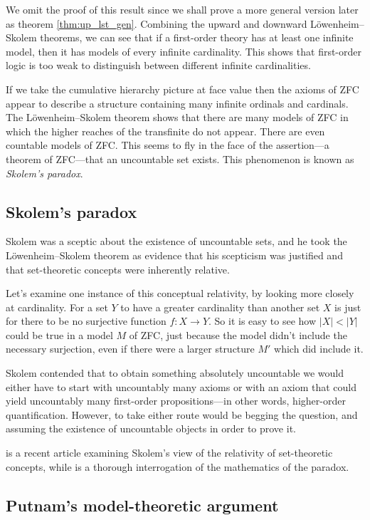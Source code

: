 \documentclass[10pt, a4paper, oneside]{article}
\theoremstyle{definition}
\theoremstyle{remark}
\theoremstyle{plain}
\theoremstyle{plain}
\begin{document}
We omit the proof of this result since we shall prove a more general version
later as theorem \ref{thm:up_lst_gen}. Combining the upward and downward
Löwenheim--Skolem theorems, we can see that if a first-order theory has at
least one infinite model, then it has models of every infinite cardinality. This
shows that first-order logic is too weak to distinguish between different
infinite cardinalities.

If we take the cumulative hierarchy picture at face value then the axioms of ZFC
appear to describe a structure containing many infinite ordinals and cardinals.
The Löwenheim--Skolem theorem shows that there are many models of ZFC in which
the higher reaches of the transfinite do not appear. There are even countable
models of ZFC. This seems to fly in the face of the assertion---a theorem of
ZFC---that an uncountable set exists. This phenomenon is known as \emph{Skolem's
paradox}.

\subsection{Skolem's paradox}

Skolem was a sceptic about the existence of uncountable sets, and he took the
Löwenheim--Skolem theorem as evidence that his scepticism was justified and
that set-theoretic concepts were inherently relative.

Let's examine one instance of this conceptual relativity, by looking more
closely at cardinality. For a set $Y$ to have a greater cardinality than another
set $X$ is just for there to be no surjective function $f : X \rightarrow Y$. So
it is easy to see how $|X| < |Y|$ could be true in a model $M$ of ZFC, just
because the model didn't include the necessary surjection, even if there were a
larger structure $M'$ which did include it.

Skolem contended that to obtain something absolutely uncountable we would either
have to start with uncountably many axioms or with an axiom that could yield
uncountably many first-order propositions---in other words, higher-order
quantification. However, to take either route would be begging the question,
and assuming the existence of uncountable objects in order to prove it.

\citet{jane2001} is a recent article examining Skolem's view of the relativity
of set-theoretic concepts, while \citet{bays2007} is a thorough interrogation of
the mathematics of the paradox.

\subsection{Putnam's model-theoretic argument}
\end{document}
